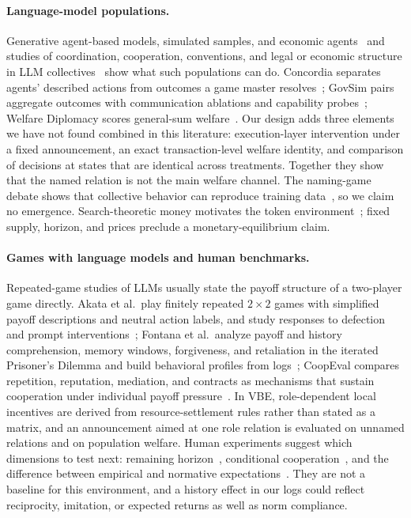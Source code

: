 \documentclass[sigconf,anonymous]{aamas}
\newcommand{\vbe}{VBE\xspace}
\begin{document}
\paragraph{Language-model populations.}  Generative agent-based models, simulated
samples, and economic agents~\cite{park2023,aher2023,argyle2023,zhou2024,anthis2025,horton2023homosilicus,li2024econagent,macy2002,epstein2006}
and studies of coordination, cooperation, conventions, and legal or economic
structure in LLM collectives~\cite{ren2024,agashe2025,flint2025,zhu2025,madmoun2026,qi2026,wang2026}
show what such populations can do.  Concordia separates agents' described actions
from outcomes a game master resolves~\cite{vezhnevets2023concordia}; GovSim pairs
aggregate outcomes with communication ablations and capability
probes~\cite{piatti2024govsim}; Welfare Diplomacy scores general-sum
welfare~\cite{mukobi2023welfarediplomacy}.  Our design adds three elements we have not
found combined in this literature: execution-layer intervention under a fixed
announcement, an exact transaction-level welfare identity, and comparison of decisions
at states that are identical across treatments.  Together they show that the
named relation is not the main welfare channel.  The naming-game
debate shows that collective behavior can reproduce training
data~\cite{barrie2025,flintreply2025}, so we claim no emergence.  Search-theoretic
money motivates the token environment~\cite{kiyotaki1989,kiyotaki1993}; fixed
supply, horizon, and prices preclude a monetary-equilibrium claim.

\paragraph{Games with language models and human benchmarks.}  Repeated-game
studies of LLMs usually state the payoff structure of a two-player game
directly.  Akata et al.\ play finitely repeated $2\times2$ games with
simplified payoff descriptions and neutral action labels, and study responses to
defection and prompt interventions~\cite{akata2025repeated}; Fontana et al.\
analyze payoff and history comprehension, memory windows, forgiveness, and
retaliation in the iterated Prisoner's Dilemma and build behavioral profiles
from logs~\cite{fontana2025nicer}; CoopEval compares repetition, reputation,
mediation, and contracts as mechanisms that sustain cooperation under
individual payoff pressure~\cite{tewolde2026coopeval}.  In \vbe, role-dependent
local incentives are derived from resource-settlement rules rather than stated
as a matrix, and an announcement aimed at one role relation is evaluated on
unnamed relations and on population welfare.  Human experiments suggest which
dimensions to test next: remaining horizon~\cite{selten1986}, conditional
cooperation~\cite{fischbacher2001}, and the difference between empirical and
normative expectations~\cite{bicchieri2006}.  They are not a baseline for this
environment, and a history effect in our logs could reflect reciprocity,
imitation, or expected returns as well as norm compliance.
\end{document}
